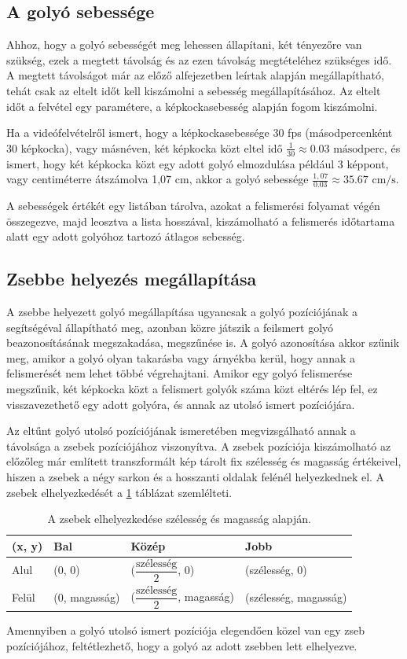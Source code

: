 \subsection{A golyó sebessége}
Ahhoz, hogy a golyó sebességét meg lehessen állapítani, két tényezőre van szükség, ezek a megtett távolság és az ezen távolság megtételéhez szükséges idő. A megtett távolságot már az előző alfejezetben leírtak alapján megállapítható, tehát csak az eltelt időt kell kiszámolni a sebesség megállapításához. Az eltelt időt a felvétel egy paramétere, a képkockasebesség alapján fogom kiszámolni.
\par Ha a videófelvételről ismert, hogy a képkockasebessége 30 fps (másodpercenként 30 képkocka), vagy másnéven, két képkocka közt eltel idő $\frac{1}{30} \approx 0.03\text{ másodperc}$, és ismert, hogy két képkocka közt egy adott golyó elmozdulása például 3 képpont, vagy centiméterre átszámolva 1,07 cm, akkor a golyó sebessége $\frac{1,07}{0.03} \approx 35.67 \text{ cm/s}$.
\par A sebességek értékét egy listában tárolva, azokat a felismerési folyamat végén összegezve, majd leosztva a lista hosszával, kiszámolható a felismerés időtartama alatt egy adott golyóhoz tartozó átlagos sebesség.

\subsection{Zsebbe helyezés megállapítása}
A zsebbe helyezett golyó megállapítása ugyancsak a golyó pozíciójának a segítségéval állapítható meg, azonban közre játszik a feilsmert golyó beazonosításának megszakadása, megszűnése is. A golyó azonosítása akkor szűnik meg, amikor a golyó olyan takarásba vagy árnyékba kerül, hogy annak a felismerését nem lehet többé végrehajtani. Amikor egy golyó felismerése megszűnik, két képkocka közt a felismert golyók száma közt eltérés lép fel, ez visszavezethető egy adott golyóra, és annak az utolsó ismert pozíciójára.
\par Az eltűnt golyó utolsó pozíciójának ismeretében megvizsgálható annak a távolsága a zsebek pozíciójához viszonyítva. A zsebek pozíciója kiszámolható az előzőleg már említett transzformált kép tárolt fix szélesség és magasság értékeivel, hiszen a zsebek a négy sarkon és a hosszanti oldalak felénél helyezkednek el. A zsebek elhelyezkedését a \ref{tab:zsebek_kiszamolasa} táblázat szemlélteti.

\begin{table}[!ht]
    \caption{A zsebek elhelyezkedése szélesség és magasság alapján.}
    \label{tab:zsebek_kiszamolasa}
	\footnotesize
	\centering
	\begin{tabular}{ l l l l }
		\toprule
		(x, y)  & Bal           & Közép                                    & Jobb \\
		\midrule
		Alul    & (0, 0)        & ($\dfrac{\text{szélesség}}{2}$, 0)        & (szélesség, 0)\\
		Felül   & (0, magasság) & ($\dfrac{\text{szélesség}}{2}$, magasság) & (szélesség, magasság)\\
		\bottomrule
	\end{tabular}
\end{table}

\par Amennyiben a golyó utolsó ismert pozíciója elegendően közel van egy zseb pozíciójához, feltétlezhető, hogy a golyó az adott zsebben lett elhelyezve.